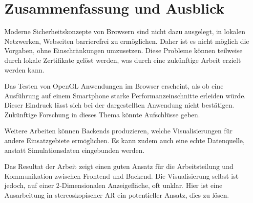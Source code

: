 \section{Zusammenfassung und Ausblick}

Moderne Sicherheitskonzepte von Browsern sind nicht dazu ausgelegt,
in lokalen Netzwerken, Webseiten barrierefrei zu ermöglichen.
Daher ist es nicht möglich die Vorgaben, ohne Einschränkungen umzusetzen.
Diese Probleme können teilweise durch lokale Zertifikate gelöst werden,
was durch eine zukünftige Arbeit erzielt werden kann.

Das Testen von OpenGL Anwendungen im Browser erscheint, als ob eine
Ausführung auf einem Smartphone starke Performanzeinschnitte erleiden
würde. Dieser Eindruck lässt sich bei der dargestellten Anwendung nicht
bestätigen. Zukünftige Forschung in dieses Thema könnte Aufschlüsse geben.

Weitere Arbeiten können Backends produzieren, welche Visualisierungen
für andere Einsatzgebiete ermöglichen. Es kann zudem auch eine echte
Datenquelle, anstatt Simulationsdaten eingebunden werden.

Das Resultat der Arbeit zeigt einen guten Ansatz für die Arbeitsteilung
und Kommunikation zwischen Frontend und Backend. Die Visualisierung selbst
ist jedoch, auf einer 2-Dimensionalen Anzeigefläche, oft unklar.
Hier ist eine Ausarbeitung in stereoskopischer AR ein potentieller
Ansatz, dies zu lösen.

%	
